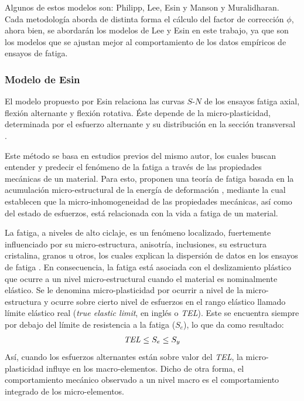 Algunos de estos modelos son: Philipp, Lee, Esin y Manson y Muralidharan. Cada metodología aborda de distinta forma el cálculo del factor de corrección $\phi$, ahora bien, se abordarán los modelos de Lee y Esin en este trabajo, ya que son los modelos que se ajustan mejor al comportamiento de los datos empíricos de ensayos de fatiga. \cite{strzelecki2018analysis}

\subsubsection{Modelo de Esin}
El modelo propuesto por Esin \cite{esin1980method} relaciona las curvas $S$-$N$ de los ensayos fatiga axial, flexión alternante y flexión rotativa. Éste depende de la micro-plasticidad, determinada por el esfuerzo alternante y su distribución en la sección transversal \cite{strzelecki2018analysis}. 

Este método se basa en estudios previos del mismo autor, los cuales buscan entender y predecir el fenómeno de la fatiga a través de las propiedades mecánicas de un material. Para esto, proponen una teoría de fatiga basada en la acumulación micro-estructural de la energía de deformación \cite{esin1966theory}, mediante la cual establecen que la micro-inhomogeneidad de las propiedades mecánicas, así como del estado de esfuerzos, está relacionada con la vida a fatiga de un material.

La fatiga, a niveles de alto ciclaje, es un fenómeno localizado, fuertemente influenciado por su micro-estructura, anisotría, inclusiones, su estructura cristalina, granos u otros, los cuales explican la dispersión de datos en los ensayos de fatiga \cite{esin1968microplastic}. En consecuencia, la fatiga está asociada con el deslizamiento plástico que ocurre a un nivel micro-estructural cuando el material es nominalmente elástico. Se le denomina micro-plasticidad por ocurrir a nivel de la micro-estructura y ocurre sobre cierto nivel de esfuerzos en el rango elástico llamado límite elástico real (\textit{true elastic limit}, en inglés o \textit{TEL}). Este se encuentra siempre por debajo del límite de resistencia a la fatiga ($S_e$), lo que da como resultado:
\begin{align*}
	\text{\textit{TEL}} \leq S_e \leq S_y
\end{align*}
Así, cuando los esfuerzos alternantes están sobre valor del  \textit{TEL}, la micro-plasticidad influye en los macro-elementos. Dicho de otra forma, el comportamiento mecánico observado a un nivel macro es el comportamiento integrado de los micro-elementos.

